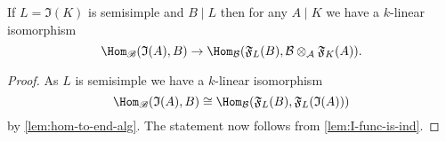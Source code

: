 \documentclass[eqthmnum,nocolour,skinny]{jt-calcs}
\begin{document}
\begin{cor}\label{cor:decomp-ind-semisimple}
If $L = \mathfrak{I}(K)$ is semisimple and $B \mid L$ then for any $A \mid K$ we have a $k$-linear isomorphism
\begin{equation*}
\Hom_{\mathscr{B}}(\mathfrak{I}(A),B) \to \Hom_{\mathcal{B}}(\mathfrak{F}_L(B),\mathcal{B} \otimes_{\mathcal{A}}\mathfrak{F}_K(A)).
\end{equation*}
\end{cor}

\begin{proof}
As $L$ is semisimple we have a $k$-linear isomorphism
\begin{equation*}
\Hom_{\mathscr{B}}(\mathfrak{I}(A),B) \cong \Hom_{\mathcal{B}}(\mathfrak{F}_L(B),\mathfrak{F}_L(\mathfrak{I}(A)))
\end{equation*}
by \cref{lem:hom-to-end-alg}. The statement now follows from \cref{lem:I-func-is-ind}.
\end{proof}
\end{document}
